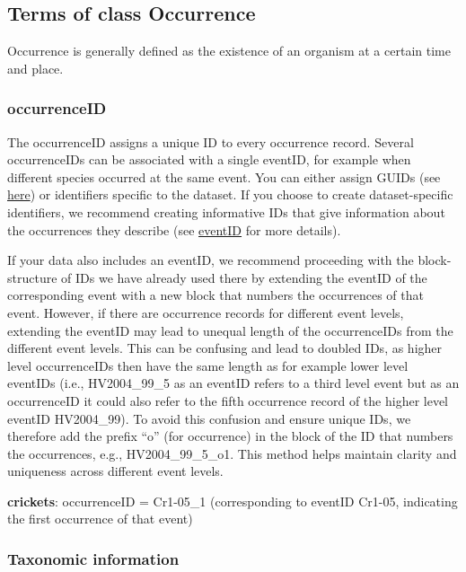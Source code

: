 \documentclass[
]{book}
\begin{document}
\hypertarget{terms-of-class-occurrence}{%
\subsection{Terms of class Occurrence}\label{terms-of-class-occurrence}}

Occurrence is generally defined as the existence of an organism at a certain time and place.

\hypertarget{occurrenceID}{%
\subsubsection{occurrenceID}\label{occurrenceID}}

The occurrenceID assigns a unique ID to every occurrence record. Several occurrenceIDs can be associated with a single eventID, for example when different species occurred at the same event. You can either assign GUIDs (see \protect\hyperlink{GUIDcreation}{here}) or identifiers specific to the dataset. If you choose to create dataset-specific identifiers, we recommend creating informative IDs that give information about the occurrences they describe (see \protect\hyperlink{eventID}{eventID} for more details).

If your data also includes an eventID, we recommend proceeding with the block-structure of IDs we have already used there by extending the eventID of the corresponding event with a new block that numbers the occurrences of that event. However, if there are occurrence records for different event levels, extending the eventID may lead to unequal length of the occurrenceIDs from the different event levels. This can be confusing and lead to doubled IDs, as higher level occurrenceIDs then have the same length as for example lower level eventIDs (i.e., HV2004\_99\_5 as an eventID refers to a third level event but as an occurrenceID it could also refer to the fifth occurrence record of the higher level eventID HV2004\_99). To avoid this confusion and ensure unique IDs, we therefore add the prefix ``o'' (for occurrence) in the block of the ID that numbers the occurrences, e.g., HV2004\_99\_5\_o1. This method helps maintain clarity and uniqueness across different event levels.

\textbf{crickets}: occurrenceID = Cr1-05\_1 (corresponding to eventID Cr1-05, indicating the first occurrence of that event)

\hypertarget{taxonomic-information}{%
\subsubsection{Taxonomic information}\label{taxonomic-information}}
\end{document}
